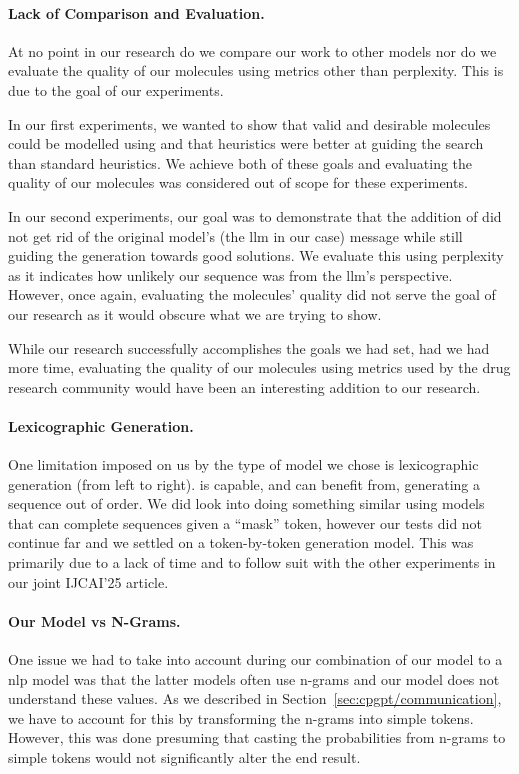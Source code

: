 \documentclass[../Document.tex]{subfiles}
\begin{document}
\paragraph{Lack of Comparison and Evaluation.}
At no point in our research do we compare our work to other models nor do we evaluate the quality of our molecules using metrics other than perplexity.
This is due to the goal of our experiments.

In our first experiments, we wanted to show that valid and desirable molecules could be modelled using \cp and that \bp heuristics were better at guiding the search than standard \cp heuristics.
We achieve both of these goals and evaluating the quality of our molecules was considered out of scope for these experiments.

In our second experiments, our goal was to demonstrate that the addition of \cp did not get rid of the original model's (the \gls{llm} in our case) message while still guiding the generation towards good solutions. 
We evaluate this using perplexity as it indicates how unlikely our sequence was from the \gls{llm}'s perspective.
However, once again, evaluating the molecules' quality did not serve the goal of our research as it would obscure what we are trying to show.

While our research successfully accomplishes the goals we had set, had we had more time, evaluating the quality of our molecules using metrics used by the drug research community would have been an interesting addition to our research.


\paragraph{Lexicographic Generation.}
One limitation imposed on us by the type of model we chose is lexicographic generation (\ie from left to right).
\cp is capable, and can benefit from, generating a sequence out of order.
We did look into doing something similar using models that can complete sequences given a ``mask'' token, however our tests did not continue far and we settled on a token-by-token generation model.
This was primarily due to a lack of time and to follow suit with the other experiments in our joint IJCAI'25 article.


\paragraph{Our \cp Model vs N-Grams.}
One issue we had to take into account during our combination of our \cp model to a \gls{nlp} model was that the latter models often use n-grams and our \cp model does not understand these values.
As we described in Section~\ref{sec:cpgpt/communication}, we have to account for this by transforming the n-grams into simple tokens.
However, this was done presuming that casting the probabilities from n-grams to simple tokens would not significantly alter the end result.
\end{document}

